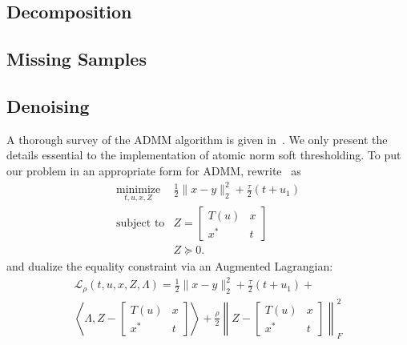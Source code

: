 \subsection{Decomposition}
\subsection{Missing Samples}
\subsection{Denoising}


A thorough survey of the ADMM algorithm is given in~\cite{admm2011}. We only
present the details essential to the implementation of atomic norm soft
thresholding. To put our problem in an appropriate form for ADMM,
rewrite~ as
\begin{equation*}
\begin{array}{ll}
\operatorname*{minimize}_{t, u, x,Z} & \frac{1}{2} \|x - y\|_2^2 + \frac{\tau}{2}(t + u_1) \\
\operatorname{subject\ to}
& Z=\begin{bmatrix}
  T(u) & x \\
  x^* & t
 \end{bmatrix} \\
& Z\succeq 0.\end{array} 
\end{equation*}
and dualize the equality constraint via an Augmented Lagrangian:
\begin{align*}
\mathcal{L}_\rho (t,u,x,Z, \Lambda)= \frac{1}{2} \|x - y\|_2^2 + \frac{\tau}{2}(t +  u_1) + \\
\left\langle   \Lambda, Z-\begin{bmatrix}
  T(u) & x \\
  x^* & t
 \end{bmatrix} \right\rangle +
  \frac{\rho}{2} \left\| Z-\begin{bmatrix}
  T(u) & x \\
  x^* & t
 \end{bmatrix} \right\|_F^2
\end{align*}

